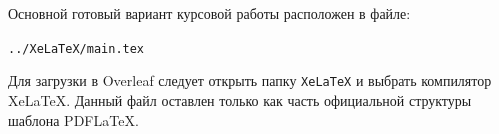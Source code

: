 \documentclass[14pt, a4paper]{extarticle}
\begin{document}

\intro

Основной готовый вариант курсовой работы расположен в файле:
\begin{center}
\texttt{../XeLaTeX/main.tex}
\end{center}

Для загрузки в Overleaf следует открыть папку \texttt{XeLaTeX} и выбрать компилятор XeLaTeX. Данный файл оставлен только как часть официальной структуры шаблона PDFLaTeX.
\end{document}
